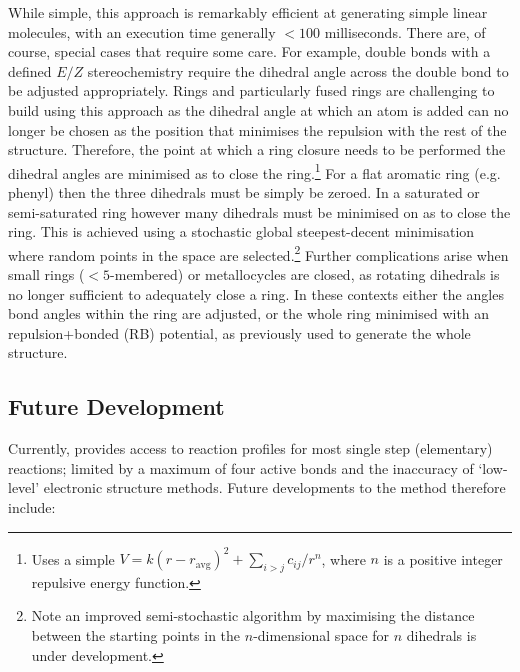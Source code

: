\documentclass[../../main.tex]{subfiles}
\begin{document}
While simple, this approach is remarkably efficient at generating simple linear molecules, with an execution time generally $<100$ milliseconds. There are, of course, special cases that require some care. For example, double bonds with a defined $E/Z$ stereochemistry require the dihedral angle across the double bond to be adjusted appropriately. Rings and particularly fused rings are challenging to build using this approach as the dihedral angle at which an atom is added can no longer be chosen as the position that minimises the repulsion with the rest of the structure. Therefore, the point at which a ring closure needs to be performed the dihedral angles are minimised as to close the ring.\footnote{Uses a simple $V = k(r-r_\text{avg})^2 + \sum_{i>j} {c_{ij}}/{r^n}$, where $n$ is a positive integer repulsive energy function.} For a flat aromatic ring (e.g. phenyl) then the three dihedrals must be simply be zeroed. In a saturated or semi-saturated ring however many dihedrals must be minimised on as to close the ring. This is achieved using a stochastic global steepest-decent minimisation where random points in the space are selected.\footnote{Note an improved semi-stochastic algorithm by maximising the distance between the starting points in the $n$-dimensional space for $n$ dihedrals is under development.} Further complications arise when small rings ($< 5$-membered) or metallocycles are closed, as rotating dihedrals is no longer sufficient to adequately close a ring. In these contexts either the angles bond angles within the ring are adjusted, or the whole ring minimised with an repulsion+bonded (RB) potential, as previously used to generate the whole structure.

\subsection{Future Development}

Currently, \ade provides access to reaction profiles for most single step (elementary) reactions; limited by a maximum of four active bonds and the inaccuracy of `low-level' electronic structure methods. Future developments to the method therefore include:
\end{document}

